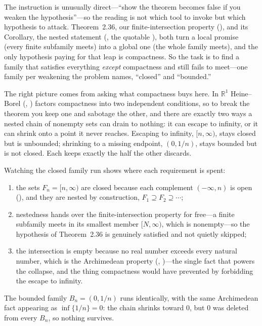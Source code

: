 \documentclass[main.tex]{subfiles}
\begin{document}
\begin{Reflection}
The instruction is unusually direct---``show the theorem becomes false if you weaken the hypothesis''---so the reading is not which tool to invoke but which hypothesis to attack. Theorem~2.36, our finite-intersection property (), and its Corollary, the nested statement
(, the quotable ), both turn a
local promise (every finite subfamily meets) into a global one (the whole family meets), and the only
hypothesis paying for that leap is compactness. So the task is to find a family that satisfies
everything \emph{except} compactness and still fails to meet---one family per weakening the problem
names, ``closed'' and ``bounded.''

The right picture comes from asking what compactness buys here. In $\mathbb R^{1}$ Heine--Borel
(, ) factors compactness into two independent
conditions, so to break the theorem you keep one and sabotage the other, and there are exactly two ways
a nested chain of nonempty sets can drain to nothing: it can escape to infinity, or it can shrink onto
a point it never reaches. Escaping to infinity, $[n,\infty)$, stays closed but is unbounded; shrinking
to a missing endpoint, $(0,1/n)$, stays bounded but is not closed. Each keeps exactly the half the
other discards.

Watching the closed family run shows where each requirement is spent:
\begin{enumerate}[leftmargin=1.7em,itemsep=3pt,topsep=2pt,label=\textnormal{(\arabic*)}]
  \item the sets $F_n=[n,\infty)$ are closed because each complement $(-\infty,n)$ is open
        (), and they are nested by construction, $F_1\supseteq F_2\supseteq\cdots$;
  \item nestedness hands over the finite-intersection property for free---a finite subfamily meets in
        its smallest member $[N,\infty)$, which is nonempty---so the hypothesis of Theorem~2.36 is
        genuinely satisfied and not quietly skipped;
  \item the intersection is empty because no real number exceeds every natural number, which is the
        Archimedean property (, )---the
        single fact that powers the collapse, and the thing compactness would have prevented by
        forbidding the escape to infinity.
\end{enumerate}
The bounded family $B_n=(0,1/n)$ runs identically, with the same Archimedean fact appearing as
$\inf\{1/n\}=0$: the chain shrinks toward $0$, but $0$ was deleted from every $B_n$, so nothing
survives.


\end{Reflection}
\end{document}
